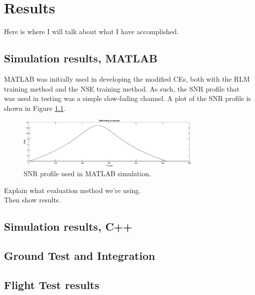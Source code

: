 \chapter{Results}\label{ch:results}

\par Here is where I will talk about what I have accomplished.
\section{Simulation results, MATLAB}
\par MATLAB was initially used in developing the modified CEs, both with the RLM training method and the NSE training method. As such, the SNR profile that was used in testing was a simple slow-fading channel. A plot of the SNR profile is shown in Figure \ref{fig:matlabSNRProf}. 

\begin{figure}[ht]
\centering
\includegraphics[width=0.8\textwidth]{figures/matlab_sim_results/snrPRofile_matlabsim.eps}
\caption{SNR profile used in MATLAB simulation.}
\label{fig:matlabSNRProf}
\end{figure}
Explain what evaluation method we're using. \\
Then show results.
\section{Simulation results, C++}
\section{Ground Test and Integration}
\section{Flight Test results}